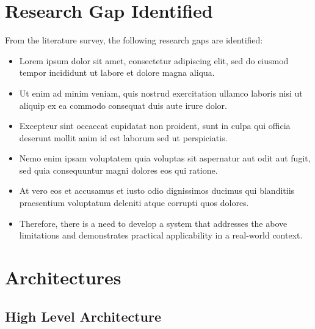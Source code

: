 \documentclass[12pt,a4paper]{report}
\begin{document}
\chapter{Research Gap Identified}

From the literature survey, the following research gaps are identified:

\begin{itemize}
    \item Lorem ipsum dolor sit amet, consectetur adipiscing elit, sed do eiusmod tempor incididunt ut labore et dolore magna aliqua.

    \item Ut enim ad minim veniam, quis nostrud exercitation ullamco laboris nisi ut aliquip ex ea commodo consequat duis aute irure dolor.

    \item Excepteur sint occaecat cupidatat non proident, sunt in culpa qui officia deserunt mollit anim id est laborum sed ut perspiciatis.

    \item Nemo enim ipsam voluptatem quia voluptas sit aspernatur aut odit aut fugit, sed quia consequuntur magni dolores eos qui ratione.

    \item At vero eos et accusamus et iusto odio dignissimos ducimus qui blanditiis praesentium voluptatum deleniti atque corrupti quos dolores.

    \item Therefore, there is a need to develop a system that addresses the above limitations and demonstrates practical applicability in a real-world context.
\end{itemize}

\chapter{Architectures}

\section{High Level Architecture}
\end{document}
